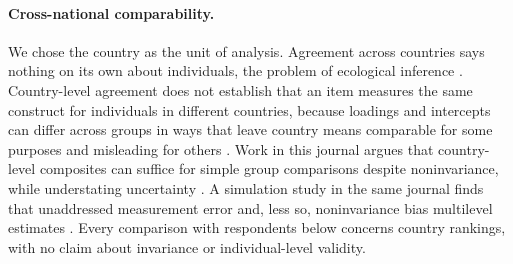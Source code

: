 \paragraph{Cross-national comparability.} We chose the country as the unit of analysis. Agreement across countries says nothing on its own about individuals, the problem of ecological inference \citep{robinson1950}. Country-level agreement does not establish that an item measures the same construct for individuals in different countries, because loadings and intercepts can differ across groups in ways that leave country means comparable for some purposes and misleading for others \citep{steenkamp1998,davidov2014}. Work in this journal argues that country-level composites can suffice for simple group comparisons despite noninvariance, while understating uncertainty \citep{bratt2025}. A simulation study in the same journal finds that unaddressed measurement error and, less so, noninvariance bias multilevel estimates \citep{pokropek2025}. Every comparison with respondents below concerns country rankings, with no claim about invariance or individual-level validity.
